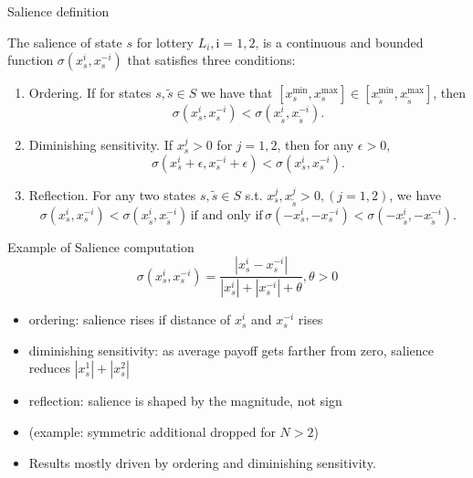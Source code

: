 \documentclass[11pt, aspectratio=169]{beamer}
\begin{document}
\begin{frame}{Salience definition}
    \begin{definition}
        The salience of state $s$ for lottery $L_i, \mathrm{i}=1,2$, is a continuous and bounded function $\sigma\left(x_s^i, x_s^{-i}\right)$ that satisfies three conditions:\\
        \begin{enumerate}
            \item Ordering. If for states $s, \tilde{s} \in S$ we have that $\left[x_s^{\min }, x_s^{\max }\right] \in \left[x_{\tilde{s}}^{\min }, x_{\tilde{s}}^{\max }\right]$, then
    \[
    \sigma\left(x_s^i, x_s^{-i}\right)<\sigma\left(x_{\tilde{s}}^i, x_{\tilde{s}}^{-i}\right) .
    \]
            \item Diminishing sensitivity. If $x_s^j>0$ for $j=1,2$, then for any $\epsilon>0$,
\[
\sigma\left(x_s^i+\epsilon, x_s^{-i}+\epsilon\right)<\sigma\left(x_s^i, x_s^{-i}\right) .
\]
            \item Reflection. For any two states $s, \tilde{s} \in S$ s.t. $x_s^j, x_{\tilde{s}}^j>0, (j=1,2)$, we have
            \[\sigma\left(x_s^i, x_s^{-i}\right)<\sigma\left(x_{\tilde{s}}^i, x_{\tilde{s}}^{-i}\right)\, \text{if and only if}\, \sigma\left(-x_s^i,-x_s^{-i}\right)<\sigma\left(-x_{\tilde{s}}^i,-x_{\tilde{s}}^{-i}\right).\]
        \end{enumerate}
    \end{definition}
\end{frame}

\begin{frame}{Example of Salience computation}
\[
    \sigma\left(x_s^i, x_s^{-i}\right)=\frac{\left|x_s^i-x_s^{-i}\right|}{\left|x_s^i\right|+\left|x_s^{-i}\right|+\theta}, \theta>0
    \]
    \begin{itemize}
        \item ordering: salience rises if distance of  $x_s^i$ and $x_s^{-i}$ rises\medskip
        \item diminishing sensitivity: as average payoff gets farther from zero, salience reduces $\left|x_s^1\right|+\left|x_s^2\right|$\medskip
        \item reflection: salience is shaped by the magnitude, not sign\medskip
        \item (example: symmetric additional dropped for $N>2$)\medskip
        \item Results mostly driven by ordering and diminishing sensitivity.\medskip
	\end{itemize}
\end{frame}
\end{document}
